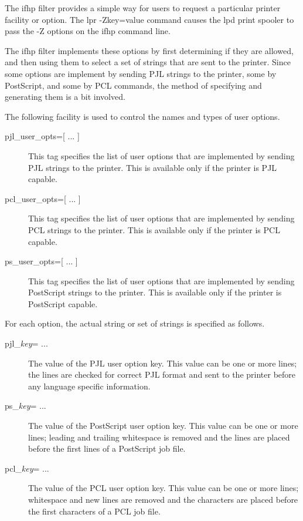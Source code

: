 \documentclass[a4paper]{article}
\begin{document}
The {\ttfamily ifhp} filter provides a simple way for users to request
a particular printer facility or option.
The {\ttfamily lpr -Zkey=value} command causes the {\ttfamily lpd}
print spooler to pass the {\ttfamily -Z} options on the {\ttfamily ifhp} command line.

The {\ttfamily ifhp} filter implements these options by first determining if they
are allowed,
and then using them to select a set of strings that are sent to the printer.
Since some options are implement by sending PJL strings to the printer,
some by PostScript,
and some by PCL commands,
the method of specifying and generating them is a bit involved.

The following facility is used to control the names and types of user
options.
\begin{description}
\item[pjl\_user\_opts={[} ... {]}] \mbox{}

This tag specifies the list of user options that are implemented by
sending PJL strings to the printer.
This is available only if the printer is PJL capable.

\item[pcl\_user\_opts={[} ... {]}] \mbox{}

This tag specifies the list of user options that are implemented by
sending PCL strings to the printer.
This is available only if the printer is PCL capable.

\item[ps\_user\_opts={[} ... {]}] \mbox{}

This tag specifies the list of user options that are implemented by
sending PostScript strings to the printer.
This is available only if the printer is PostScript capable.

\end{description}


For each option,
the actual string or set of strings is specified as follows.
\begin{description}
\item[pjl\_{\itshape key\/}= ...] \mbox{}

The value of the PJL user option {\ttfamily key}.
This value can be one or more lines;
the lines are checked for correct PJL format and sent to the printer
before any language specific information.

\item[ps\_{\itshape key\/}= ... ] \mbox{}

The value of the PostScript user option {\ttfamily key}.
This value can be one or more lines;
leading and trailing whitespace is removed and the lines are
placed before the first lines of a PostScript job file.

\item[pcl\_{\itshape key\/}= ... ] \mbox{}

The value of the PCL user option {\ttfamily key}.
This value can be one or more lines;
whitespace and new lines are removed and the
characters are placed before the first characters of a PCL job file.

\end{description}
\end{document}
